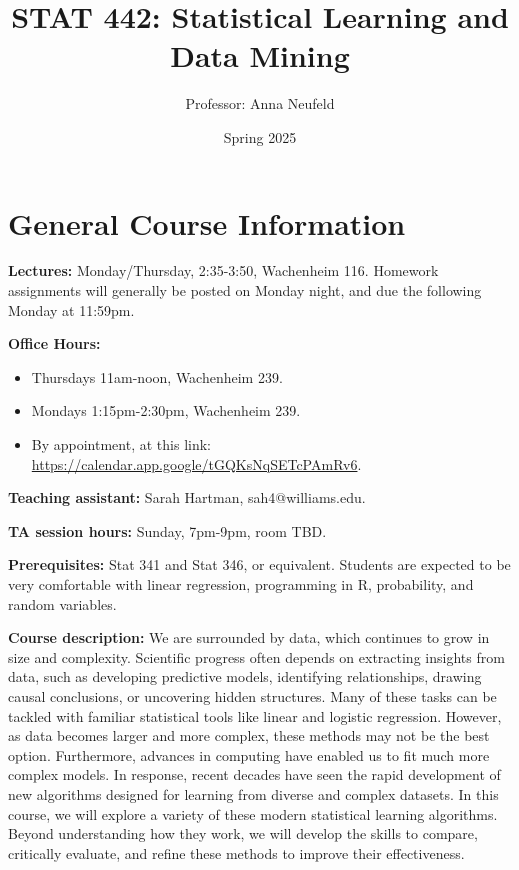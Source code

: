 \documentclass[11pt]{article}
\title{STAT 442: Statistical Learning and Data Mining}
\author{Professor: Anna Neufeld}
\date{Spring 2025}
\begin{document}
\maketitle

\noindent\makebox[\linewidth]{\rule{\textwidth}{0.4pt}}


\section{General Course Information}
\begin{list}{}{}
\item[\textbf{Lectures:}] Monday/Thursday, 2:35-3:50, Wachenheim 116. Homework assignments will generally be posted on Monday night, and due the following Monday at 11:59pm. 
\item[\textbf{Office Hours:}] 
\begin{itemize}
\item Thursdays 11am-noon, Wachenheim 239. 
\item Mondays 1:15pm-2:30pm, Wachenheim 239. 
\item By appointment, at this link: \href{https://calendar.app.google/tGQKsNqSETcPAmRv6}{https://calendar.app.google/tGQKsNqSETcPAmRv6}. 
\end{itemize}
\item[\textbf{Teaching assistant:}] Sarah Hartman, sah4@williams.edu.
\item[\textbf{TA session hours:}] Sunday, 7pm-9pm, room TBD. 
\item[\textbf{Prerequisites:}] Stat 341 and Stat 346, or equivalent. Students are expected to be very comfortable with linear regression, programming in R, probability, and random variables.  
\item[\textbf{Course description:}] We are surrounded by data, which continues to grow in size and complexity. Scientific progress often depends on extracting insights from data, such as developing predictive models, identifying relationships, drawing causal conclusions, or uncovering hidden structures. Many of these tasks can be tackled with familiar statistical tools like linear and logistic regression. However, as data becomes larger and more complex, these methods may not be the best option. Furthermore, advances in computing have enabled us to fit much more complex models. In response, recent decades have seen the rapid development of new algorithms designed for learning from diverse and complex datasets. In this course, we will explore a variety of these modern statistical learning algorithms. Beyond understanding how they work, we will develop the skills to compare, critically evaluate, and refine these methods to improve their effectiveness. 


\end{list}
\end{document}
